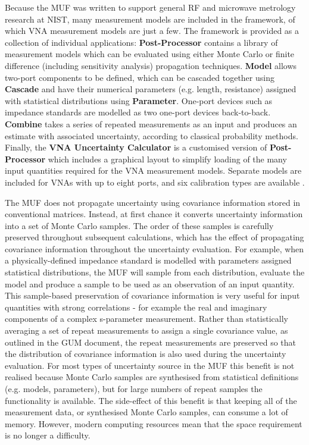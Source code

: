 \documentclass[../thesis/thesis.tex]{subfiles}
\begin{document}
Because the MUF was written to support general RF and microwave metrology research at NIST, many measurement models are included in the framework, of which VNA measurement models are just a few. The framework is provided as a collection of individual applications: \textbf{Post-Processor} contains a library of measurement models which can be evaluated using either Monte Carlo or finite difference (including sensitivity analysis) propagation techniques. \textbf{Model} allows two-port components to be defined, which can be cascaded together using \textbf{Cascade} and have their numerical parameters (e.g. length, resistance) assigned with statistical distributions using \textbf{Parameter}. One-port devices such as impedance standards are modelled as two one-port devices back-to-back. \textbf{Combine} takes a series of repeated measurements as an input and produces an estimate with associated uncertainty, according to classical probability methods. Finally, the \textbf{VNA Uncertainty Calculator} is a customised version of \textbf{Post-Processor} which includes a graphical layout to simplify loading of the many input quantities required for the VNA measurement models. Separate models are included for VNAs with up to eight ports, and six calibration types are available \cite{Jargon_2019}.

The MUF does not propagate uncertainty using covariance information stored in conventional matrices. Instead, at first chance it converts uncertainty information into a set of Monte Carlo samples. The order of these samples is carefully preserved throughout subsequent calculations, which has the effect of propagating covariance information throughout the uncertainty evaluation. For example, when a physically-defined impedance standard is modelled with parameters assigned statistical distributions, the MUF will sample from each distribution, evaluate the model and produce a sample to be used as an observation of an input quantity. This sample-based preservation of covariance information is very useful for input quantities with strong correlations - for example the real and imaginary components of a complex s-parameter measurement. Rather than statistically averaging a set of repeat measurements to assign a single covariance value, as outlined in the GUM document, the repeat measurements are preserved so that the distribution of covariance information is also used during the uncertainty evaluation. For most types of uncertainty source in the MUF this benefit is not realised because Monte Carlo samples are synthesised from statistical definitions (e.g. models, parameters), but for large numbers of repeat samples the functionality is available. The side-effect of this benefit is that keeping all of the measurement data, or synthesised Monte Carlo samples, can consume a lot of memory. However, modern computing resources mean that the space requirement is no longer a difficulty.
\end{document}
